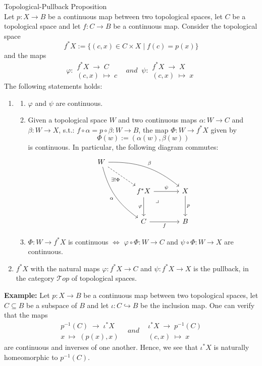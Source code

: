 \begin{proposition}{Topological-Pullback Proposition}\\
Let $p: X \to B$ be a continuous map between two topological spaces, let $C$ be a topological space and let $f: C \to B$ be a continuous map. Consider the topological space
$$f^* X:= \{ (c,x) \in C \times X \mid f(c) =p(x) \}$$
and the maps
$$\varphi :\substack{f^* X \;\to \; C\\
(c,x) \;\mapsto\; c } \;\;\;and\;\; \psi: \substack{f^*X\;\to\; X\\
(c,x) \;\mapsto\; x }$$
The following statements holds:
\begin{enumerate}
    \item \begin{enumerate}
        \item $\varphi$ and $\psi$ are continuous.
        \item Given a topological space $W$ and two continuous maps $\alpha: W \to C$ and $\beta: W \to X$, s.t.: $f \circ \alpha = p\circ \beta: W \to B$, the map $\Phi: W \to f^*X$ given by
        $$\Phi(w) := (\alpha(w),\beta(w))$$
        is continuous. In particular, the following diagram commutes:
        $$\begin{tikzcd}[row sep=large, column sep=large]
            W \arrow[dr, dashed, "\exists! \Phi"'] \arrow[drr, bend left=20, "\beta"] \arrow[ddr, bend right=20, "\alpha"'] & & \\
            & f^*X \arrow[r, "\psi"] \arrow[d, "\varphi"'] \arrow[dr, phantom, "\lrcorner", pos=0.2] & X \arrow[d, "p"] \\
            & C \arrow[r, "f"'] & B
        \end{tikzcd}$$
        \item $\Phi: W \to f^*X$ is continuous $\Leftrightarrow$ $\varphi \circ \Phi: W \to C$ and $\psi \circ \Phi: W \to X$ are continuous.
    \end{enumerate}

    \item $f^*X$ with the natural maps $\varphi:f^*X \to C$ and $\psi: f^*X \to X$ is the pullback, in the category $\mathcal{T}op$ of topological spaces.
\end{enumerate}
\end{proposition}

\noindent\textbf{Example:} Let $p: X \to B$ be a continuous map between two topological spaces, let $C \subseteq B$ be a subspace of $B$ and let $\iota: C \hookrightarrow B$ be the inclusion map. One can verify that the maps
$$\substack{p^{-1} (C) \;\to\; \iota^*X\\
x\;\mapsto\; (p(x),x) } \;\;\;and\;\;\;\substack{\iota^*X \;\to\; p^{-1}(C)\\
(c,x) \;\mapsto\; x }$$
are continuous and inverses of one another. Hence, we see that $\iota^*X$ is naturally homeomorphic to $p^{-1}(C)$.

